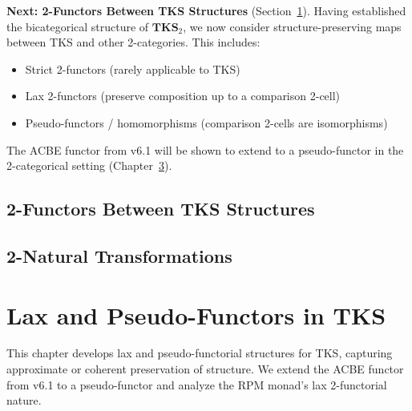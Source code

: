 \begin{remark}
\textbf{Next: 2-Functors Between TKS Structures} (Section~\ref{sec:2-functors}).
Having established the bicategorical structure of $\mathbf{TKS}_2$, we now consider
structure-preserving maps between TKS and other 2-categories. This includes:
\begin{itemize}
  \item Strict 2-functors (rarely applicable to TKS)
  \item Lax 2-functors (preserve composition up to a comparison 2-cell)
  \item Pseudo-functors / homomorphisms (comparison 2-cells are isomorphisms)
\end{itemize}
The ACBE functor from v6.1 will be shown to extend to a pseudo-functor in the
2-categorical setting (Chapter~\ref{ch:lax-pseudo-functors}).
\end{remark}

\section{2-Functors Between TKS Structures}
\label{sec:2-functors}

\section{2-Natural Transformations}
\label{sec:2-natural-transformations}

\chapter{Lax and Pseudo-Functors in TKS}
\label{ch:lax-pseudo-functors}

\begin{tcolorbox}[colback=blue!5!white,colframe=blue!75!black,title=\vnewthree]
This chapter develops lax and pseudo-functorial structures for TKS, capturing
approximate or coherent preservation of structure. We extend the ACBE functor
from v6.1 to a pseudo-functor and analyze the RPM monad's lax 2-functorial nature.
\end{tcolorbox}

